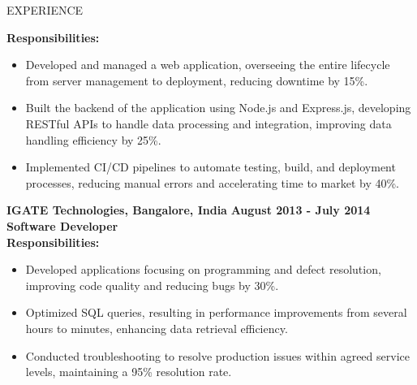 \documentclass{resume} %
\begin{document}
\begin{rSection}{EXPERIENCE}
\begin{flushleft}
            \vspace{1em}
            \textbf{Responsibilities:} \\
            \begin{itemize}
                                    \item Developed and managed a web application, overseeing the entire lifecycle from server management to deployment, reducing downtime by 15\%.
                                    \item Built the backend of the application using Node.js and Express.js, developing RESTful APIs to handle data processing and integration, improving data handling efficiency by 25\%.
                                    \item Implemented CI/CD pipelines to automate testing, build, and deployment processes, reducing manual errors and accelerating time to market by 40\%.
                            \end{itemize}
            \vspace{0.5em}
            \textbf{IGATE Technologies, Bangalore, India} \hfill \textbf{August 2013 {-} July 2014} \\
            \textbf{Software Developer} \\
            \vspace{1em}
            \textbf{Responsibilities:} \\
            \begin{itemize}
                                    \item Developed applications focusing on programming and defect resolution, improving code quality and reducing bugs by 30\%.
                                    \item Optimized SQL queries, resulting in performance improvements from several hours to minutes, enhancing data retrieval efficiency.
                                    \item Conducted troubleshooting to resolve production issues within agreed service levels, maintaining a 95\% resolution rate.
                            \end{itemize}
            \vspace{0.5em}
            \end{flushleft} 
\end{rSection}
\end{document}
